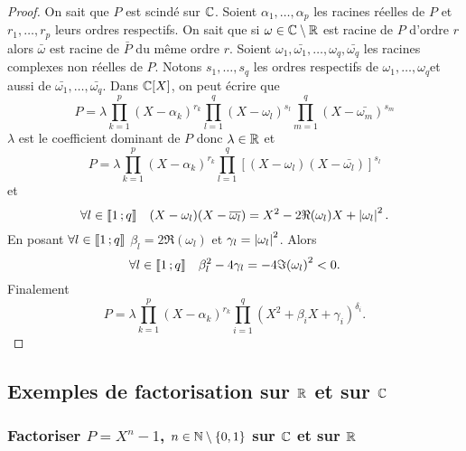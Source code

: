 \begin{proof}
  On sait que \(P\) est scindé sur \(\mathbb{C}\). Soient \(\alpha_1, \ldots, \alpha_p\) 
  les racines réelles de \(P\) et \(r_1, \ldots, r_p\) leurs ordres respectifs. 
  On sait que si \(\omega \in \mathbb{C}\setminus\mathbb{R}\) est racine de \(P\) d'ordre \(r\) 
  alors \(\bar{\omega}\) est racine de \(\bar{P}\) du même ordre \(r\).
  Soient \(\omega_1, \bar{\omega_1}, \ldots, \omega_q, \bar{\omega_q}\) les 
  racines complexes non réelles de \(P\). Notons \(s_1, \ldots, s_q\) les ordres 
  respectifs de \(\omega_1, \ldots, \omega_q\)et aussi de \(\bar{\omega_1}, 
  \ldots, \bar{\omega_q}\). Dans \(\mathbb{C}[X]\), on peut écrire que
  \begin{equation}
    P = \lambda \prod_{k = 1}^p (X-\alpha_k)^{r_k} \prod_{l = 1}^q (X-\omega_l)^{s_l} 
    \prod_{m = 1}^q (X-\bar{\omega_m})^{s_m}
  \end{equation}
  \(\lambda\) est le coefficient dominant de \(P\) donc \(\lambda \in \mathbb{R}\) et
  \begin{equation}
    P = \lambda \prod_{k = 1}^p (X-\alpha_k)^{r_k} \prod_{l = 1}^q 
    {[(X-\omega_l)(X-\bar{\omega_l})]}^{s_l}
  \end{equation}
  et \begin{equation}
    \forall l \in \mathopen{\llbracket}1\mathclose{}\mathpunct{};q\mathclose{\rrbracket} \quad (X-\omega_l)(X-\overline{\omega_l}) = 
    X^2 -2\Re(\omega_l)X + \left\lvert\omega_l\right\rvert^2.
  \end{equation}
  En posant \(\forall l \in \mathopen{\llbracket}1\mathclose{}\mathpunct{};q\mathclose{\rrbracket}\) \(\beta_l = 
  2\Re(\omega_l)\) et \(\gamma_l = \left\lvert\omega_l\right\rvert^2\). Alors
  \begin{equation}
    \forall l \in \mathopen{\llbracket}1\mathclose{}\mathpunct{};q\mathclose{\rrbracket} \quad \beta_l^2 -4\gamma_l = 
    -4{\Im(\omega_l)}^2 < 0.
  \end{equation}
  Finalement
  \begin{equation}
    P = \lambda \prod_{k = 1}^p {(X-{\alpha}_k)}^{r_k} \prod_{i = 1}^q
    {(X^2+{\beta}_{i}X+{\gamma}_i)}^{\delta_i}.
  \end{equation}
\end{proof}

\subsection{Exemples de factorisation sur \(\mathbb{R}\) et sur \(\mathbb{C}\)}

\subsubsection{Factoriser \(P = X^n-1\), \(n \in \mathbb{N}\setminus\{0,1\}\) sur \(\mathbb{C}\) 
et sur \(\mathbb{R}\)}

